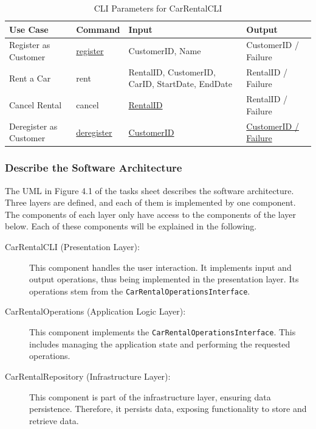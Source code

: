 \begin{table}[h]
      \centering
      \caption{CLI Parameters for CarRentalCLI}
      \label{tab:cli_parameters_car_rental_cli}
      \begin{tabular}{|p{4cm}|p{2cm}|p{4cm}|p{5cm}|}
            \hline
            \textbf{Use Case} & \textbf{Command} & \textbf{Input} & \textbf{Output} \\
            \hline
            \hline
            Register as Customer & \underline{register} & CustomerID, Name & CustomerID / Failure \\
            \hline
            Rent a Car & rent & RentalID, CustomerID, CarID, StartDate, EndDate & RentalID / Failure \\
            \hline
            Cancel Rental & cancel & \underline{RentalID} & RentalID / Failure \\
            \hline
            Deregister as Customer & \underline{deregister} & \underline{CustomerID} & \underline{CustomerID / Failure} \\
            \hline
      \end{tabular}
\end{table}

\subsubsection*{Describe the Software Architecture}
The UML in Figure 4.1 of the tasks sheet describes the software architecture.
Three layers are defined, and each of them is implemented by one component.
The components of each layer only have access to the components of the layer below.
Each of these components will be explained in the following.

\begin{description}
      \item[CarRentalCLI (Presentation Layer):] 
                  This component handles the user interaction.
                  It implements input and output operations, thus being implemented in the presentation layer.
                  Its operations stem from the \texttt{CarRentalOperationsInterface}.
      \item[CarRentalOperations (Application Logic Layer):]
                  This component implements the \texttt{CarRentalOperationsInterface}.
                  This includes managing the application state and performing the requested operations.
      \item[CarRentalRepository (Infrastructure Layer):]
                  This component is part of the infrastructure layer, ensuring data persistence.
                  Therefore, it persists data, exposing functionality to store and retrieve data.
\end{description}

